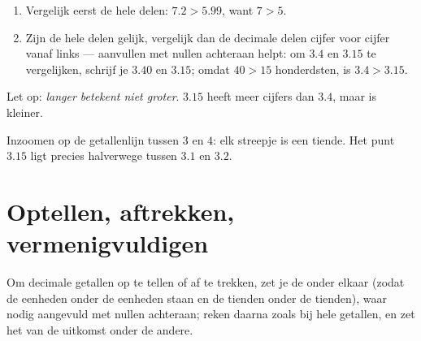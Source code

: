 \begin{method}\label{met:g6:decimals:compare}
\begin{enumerate}
  \item Vergelijk eerst de hele delen: $7.2 > 5.99$, want $7 > 5$.
  \item Zijn de hele delen gelijk, vergelijk dan de decimale delen cijfer
        voor cijfer vanaf links --- aanvullen met nullen achteraan helpt: om
        $3.4$ en $3.15$ te vergelijken, schrijf je $3.40$ en $3.15$; omdat
        $40 > 15$ honderdsten, is $3.4 > 3.15$.
\end{enumerate}
Let op: \emph{langer betekent niet groter}. $3.15$ heeft meer cijfers dan
$3.4$, maar is kleiner.
\end{method}

\begin{omfigure}

{\small Inzoomen op de getallenlijn tussen $3$ en $4$: elk streepje is een
tiende. Het punt $3.15$ ligt precies halverwege tussen $3.1$ en $3.2$.}
\end{omfigure}

\section{Optellen, aftrekken, vermenigvuldigen}

\begin{method}\label{met:g6:decimals:columns}
Om decimale getallen op te tellen of af te trekken, zet je de
\emph{} onder elkaar (zodat de eenheden onder de eenheden staan
en de tienden onder de tienden), waar nodig aangevuld met nullen achteraan;
reken daarna zoals bij hele getallen, en zet het  van de uitkomst
onder de andere.
\end{method}

